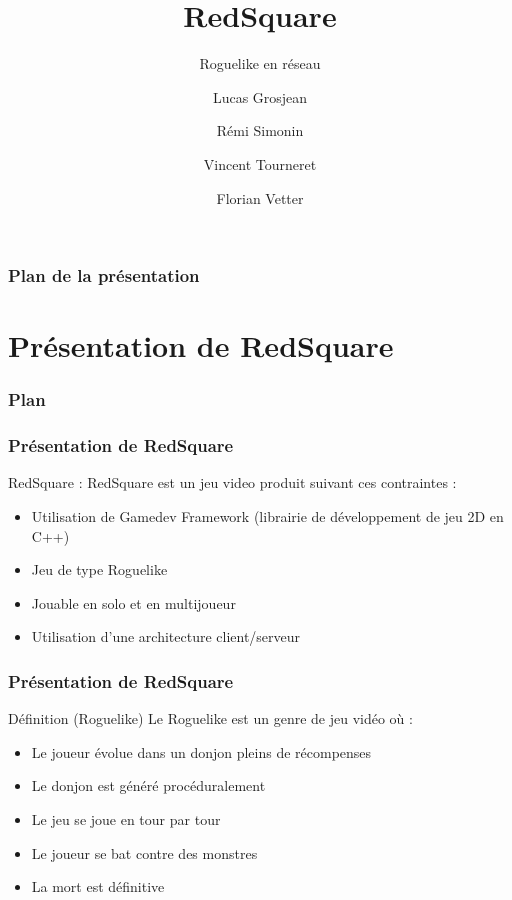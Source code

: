 \documentclass[french]{beamer}
\title{RedSquare}
\subtitle{Roguelike en réseau}
\institute[UFC]{Université de Franche-Comté \\ Licence 3}
\author[Lucas G., Rémi S., Vincent T., Florian V.]{Lucas Grosjean \and Rémi Simonin \and Vincent Tourneret \and Florian Vetter}
\begin{document}
 

\begin{frame}
\titlepage
\end{frame}

\begin{frame}
\frametitle{Plan de la présentation}
\tableofcontents
\end{frame}

\section{Présentation de RedSquare}

\begin{frame}
\frametitle{Plan}
\tableofcontents[currentsection]
\end{frame}

\begin{frame}
\frametitle{Présentation de RedSquare}
\begin{block}{RedSquare : }
RedSquare est un jeu video produit suivant ces contraintes : 
\begin{itemize}
     \item Utilisation de Gamedev Framework (librairie de développement de jeu 2D en C++)
     \item Jeu de type Roguelike
     \item Jouable en solo et en multijoueur
     \item Utilisation d'une architecture client/serveur
\end{itemize}
\end{block}
\end{frame}

\begin{frame}
\frametitle{Présentation de RedSquare}
\begin{block}{Définition (Roguelike) }
Le Roguelike est un genre de jeu vidéo où :
\begin{itemize}
    \item Le joueur évolue dans un donjon pleins de récompenses
    \item Le donjon est généré procéduralement
    \item Le jeu se joue en tour par tour
    \item Le joueur se bat contre des monstres
    \item La mort est définitive
\end{itemize}
\end{block}
\end{frame}
\end{document}
